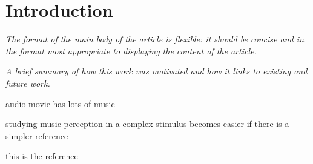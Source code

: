 \section*{Introduction} 
\textit{The format of the main body of the article is flexible: it should be concise and in the format most appropriate to displaying the content of the article.}

\textit{A brief summary of how this work was motivated and how it links to existing and future work.}

audio movie has lots of music

studying music perception in a complex stimulus becomes easier if there is a simpler reference

this is the reference

\cite{Casey_2012}